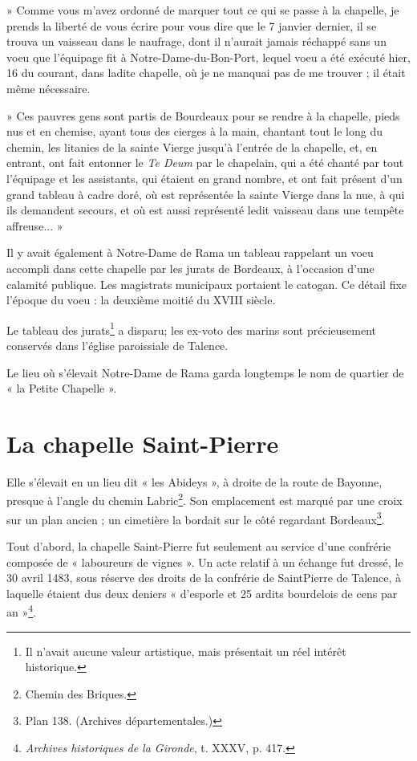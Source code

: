 \documentclass[a4paper,11pt]{book}
\begin{document}
» Comme vous m'avez ordonné de marquer tout ce qui se passe à la chapelle, je prends la liberté de vous écrire pour vous dire que le 7 janvier dernier, il se trouva un vaisseau dans le naufrage, dont il n'aurait jamais réchappé sans un voeu que l'équipage fit à Notre-Dame-du-Bon-Port, lequel voeu a été exécuté hier, 16 du courant, dans ladite chapelle, où je ne manquai pas de me trouver ; il était même nécessaire.

» Ces pauvres gens sont partis de Bourdeaux pour se rendre à la chapelle, pieds nus et en chemise, ayant tous des cierges à la main, chantant tout le long du chemin, les litanies de la sainte Vierge jusqu'à l'entrée de la chapelle, et, en entrant, ont fait entonner le \textit{Te Deum} par le chapelain, qui a été chanté par tout l'équipage et les assistants, qui étaient en grand nombre, et ont fait présent d'un grand tableau à cadre doré, où est représentée la sainte Vierge dans la nue, à qui ils demandent secours, et où est aussi représenté ledit vaisseau dans une tempête affreuse... »

Il y avait également à Notre-Dame de Rama un tableau rappelant un voeu accompli dans cette chapelle par les jurats de Bordeaux, à l'occasion d'une calamité publique. Les magistrats municipaux portaient le catogan. Ce détail fixe l'époque du voeu : la deuxième moitié du XVIII\ieme{} siècle.

Le tableau des jurats\footnote{Il n'avait aucune valeur artistique, mais présentait un réel intérêt historique.} a disparu; les ex-voto des marins sont précieusement conservés dans l'église paroissiale de Talence.

Le lieu où s'élevait Notre-Dame de Rama garda longtemps le nom de quartier de « la Petite Chapelle ».

\section{La chapelle Saint-Pierre}

Elle s'élevait en un lieu dit « les Abideys », à droite de la route de Bayonne, presque à l'angle du chemin Labric\footnote{Chemin des Briques.}. Son emplacement est marqué par une croix sur un plan ancien ; un cimetière la bordait sur le côté regardant Bordeaux\footnote{Plan 138. (Archives départementales.)}.

Tout d'abord, la chapelle Saint-Pierre fut seulement au service d'une confrérie composée de « laboureurs de vignes ». Un acte relatif à un échange fut dressé, le 30 avril 1483, sous réserve des droits de la confrérie de SaintPierre de Talence, à laquelle étaient dus deux deniers « d'esporle et 25 ardits bourdelois de cens par an »\footnote{\textit{Archives historiques de la Gironde}, t. XXXV, p. 417.}.
\end{document}

